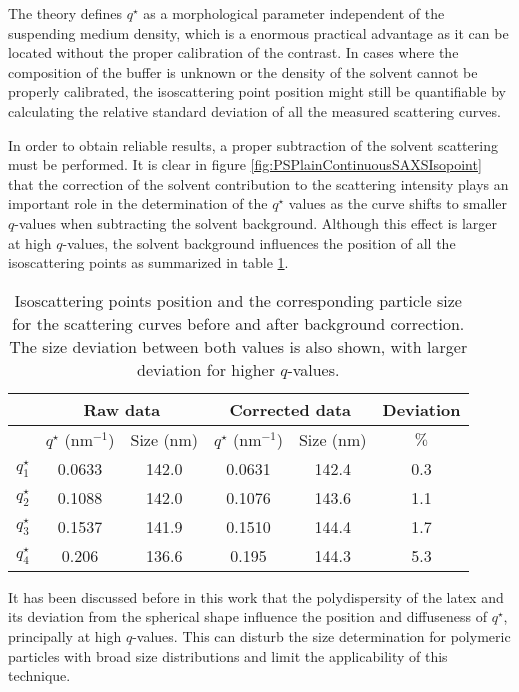 The theory defines $q^{\star}$ as a morphological parameter independent of the suspending medium density, which is a enormous practical advantage as it can be located without the proper calibration of the contrast. In cases where the composition of the buffer is unknown or the density of the solvent cannot be properly calibrated, the isoscattering point position might still be quantifiable by calculating the relative standard deviation of all the measured scattering curves. 

In order to obtain reliable results, a proper subtraction of the solvent scattering must be performed. It is clear in figure \ref{fig:PSPlainContinuousSAXSIsopoint} that the correction of the solvent contribution to the scattering intensity plays an important role in the determination of the $q^{\star}$ values as the curve shifts to smaller $q$-values when subtracting the solvent background. Although this effect is larger at high $q$-values, the solvent background influences the position of all the isoscattering points as summarized in table \ref{tab:isoscattering_points}. 

\begin{table}
	\centering
	\begin{tabular}{l||cc|cc|c}
		 & \multicolumn{2}{c}{Raw data} & \multicolumn{2}{c}{Corrected data} & Deviation\\
		 \hline
		 & \( q^{\star} \) (nm\(^{-1}\))    &  Size (nm) & \( q^{\star}\) (nm\(^{-1}\))    &  Size (nm) & $\%$ \\
		\hline
		 \(q^{\star}_1\) &  0.0633 & 142.0 &  0.0631 & 142.4 & 0.3 \\
		 \(q^{\star}_2\) &  0.1088 & 142.0 &  0.1076 & 143.6 & 1.1   \\
		 \(q^{\star}_3\) &  0.1537 & 141.9 &  0.1510 & 144.4 & 1.7    \\
		 \(q^{\star}_4\) &  0.206  & 136.6 &  0.195  & 144.3 & 5.3     \\
		\end{tabular}
	\caption[Isoscattering points position and the corresponding particle size.]{Isoscattering points position and the corresponding particle size for the scattering curves before and after background correction. The size deviation between both values is also shown, with larger deviation for higher $q$-values.}
	\label{tab:isoscattering_points}
\end{table}

It has been discussed before in this work that the polydispersity of the latex and its deviation from the spherical shape influence the position and diffuseness of $q^{\star}$, principally at high $q$-values. This can disturb the size determination for polymeric particles with broad size distributions and limit the applicability of this technique. 

